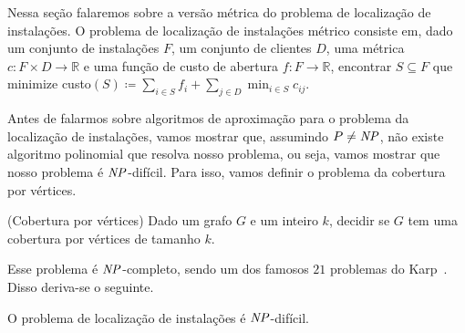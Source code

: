 Nessa seção falaremos sobre a versão métrica do problema de localização de instalações. 
O problema de localização de instalações métrico consiste em, dado um conjunto de instalações $F$, um conjunto de clientes $D$, uma métrica $c : F \times D \rightarrow \mathbb{R}$ e uma função de custo de abertura $f: F \rightarrow \mathbb{R}$, encontrar $S \subseteq F$ que minimize custo${(S) \coloneqq \sum_{i \in S} f_i +  \sum_{j \in D} \min_{i \in S} c_{ij}}$.

Antes de falarmos sobre algoritmos de aproximação para o problema da localização de instalações, vamos mostrar que, assumindo $P\neq\mathit{NP}$, não existe algoritmo polinomial que resolva nosso problema, ou seja, vamos mostrar que nosso problema é $\mathit{NP}$-difícil. Para isso, vamos definir o problema da cobertura por vértices.



\begin{problem}(Cobertura por vértices)
    Dado um grafo $G$ e um inteiro $k$, decidir se $G$ tem uma cobertura por vértices de tamanho $k$.
\end{problem}
Esse problema é $\mathit{NP}$-completo, sendo um dos famosos $21$ problemas do Karp~\cite{Karp1972}. Disso deriva-se o seguinte.

\begin{theorem}
    O problema de localização de instalações é $\mathit{NP}$-difícil.
\end{theorem}

